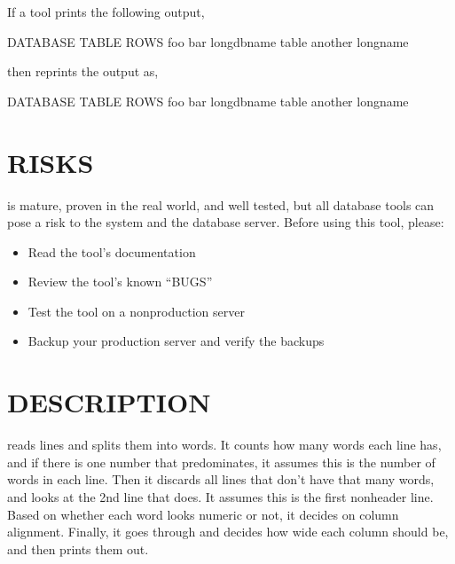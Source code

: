 \documentclass[letterpaper,10pt,english]{sphinxmanual}
\begin{document}
\sphinxAtStartPar
If a tool prints the following output,

\begin{sphinxVerbatim}[commandchars=\\\{\}]
DATABASE TABLE   ROWS
foo      bar      
long\PYGZus{}db\PYGZus{}name table  
another  long\PYGZus{}name 
\end{sphinxVerbatim}

\sphinxAtStartPar
then  reprints the output as,

\begin{sphinxVerbatim}[commandchars=\\\{\}]
DATABASE     TABLE     ROWS
foo          bar        
long\PYGZus{}db\PYGZus{}name table        
another      long\PYGZus{}name  
\end{sphinxVerbatim}


\section{RISKS}
\label{\detokenize{mariadb-align-output:risks}}
\sphinxAtStartPar
{} is mature, proven in the real world, and well tested,
but all database tools can pose a risk to the system and the database
server.  Before using this tool, please:
\begin{itemize}
\item {} 
\sphinxAtStartPar
Read the tool’s documentation

\item {} 
\sphinxAtStartPar
Review the tool’s known “BUGS”

\item {} 
\sphinxAtStartPar
Test the tool on a non\sphinxhyphen{}production server

\item {} 
\sphinxAtStartPar
Backup your production server and verify the backups

\end{itemize}


\section{DESCRIPTION}
\label{\detokenize{mariadb-align-output:description}}
\sphinxAtStartPar
{} reads lines and splits them into words.  It counts how many
words each line has, and if there is one number that predominates, it assumes
this is the number of words in each line.  Then it discards all lines that
don’t have that many words, and looks at the 2nd line that does.  It assumes
this is the first non\sphinxhyphen{}header line.  Based on whether each word looks numeric
or not, it decides on column alignment.  Finally, it goes through and decides
how wide each column should be, and then prints them out.
\end{document}
